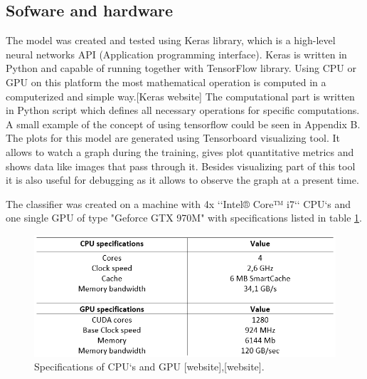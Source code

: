 \subsection{Sofware and hardware}
The model was created and tested using Keras library, which is a high-level neural networks API (Application programming interface). Keras is written in Python and capable of running together with TensorFlow library. Using CPU or GPU on this platform the most mathematical operation  is computed in a computerized and simple way.[Keras website] The computational part is written in Python script which defines all necessary operations for specific computations. A small example of the concept of using tensorflow could be seen in Appendix B. The plots for this model are generated using Tensorboard visualizing tool. It allows to watch a graph during the training, gives plot quantitative metrics and shows data like images that pass through it. Besides visualizing part of this tool it is also useful for debugging as it allows to observe the graph at a present time.\citep{Abadi2016a}

\noindent
The classifier was created on a machine with 4x ‘‘Intel® Core™ i7‘‘ CPU‘s and one single GPU of type "Geforce GTX 970M" with specifications listed in table \ref{fig:Specs}.

\begin{figure} [H]
\centering
\includegraphics[width=1\textwidth]{figures/Specs}
\caption{Specifications of CPU‘s and GPU [website],[website].}
\label{fig:Specs}
\end{figure}